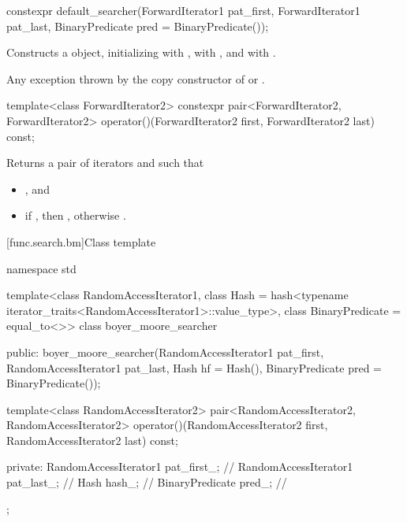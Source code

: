 %
\begin{itemdecl}
constexpr default_searcher(ForwardIterator1 pat_first, ForwardIterator1 pat_last,
                           BinaryPredicate pred = BinaryPredicate());
\end{itemdecl}

\begin{itemdescr}
\pnum
\effects
Constructs a  object, initializing 
with , \mbox{} with , and
 with .

\pnum
\throws
Any exception thrown by the copy constructor of  or
.
\end{itemdescr}

%
\begin{itemdecl}
template<class ForwardIterator2>
  constexpr pair<ForwardIterator2, ForwardIterator2>
    operator()(ForwardIterator2 first, ForwardIterator2 last) const;
\end{itemdecl}

\begin{itemdescr}
\pnum
\effects
Returns a pair of iterators  and  such that
\begin{itemize}
\item {}, and
\item if , then ,
otherwise .
\end{itemize}
\end{itemdescr}

[func.search.bm]{Class template }

%
\begin{codeblock}
namespace std {
  template<class RandomAccessIterator1,
           class Hash = hash<typename iterator_traits<RandomAccessIterator1>::value_type>,
           class BinaryPredicate = equal_to<>>
  class boyer_moore_searcher {
  public:
    boyer_moore_searcher(RandomAccessIterator1 pat_first,
                         RandomAccessIterator1 pat_last,
                         Hash hf = Hash(),
                         BinaryPredicate pred = BinaryPredicate());

    template<class RandomAccessIterator2>
      pair<RandomAccessIterator2, RandomAccessIterator2>
        operator()(RandomAccessIterator2 first, RandomAccessIterator2 last) const;

  private:
    RandomAccessIterator1 pat_first_;   // \expos
    RandomAccessIterator1 pat_last_;    // \expos
    Hash hash_;                         // \expos
    BinaryPredicate pred_;              // \expos
  };
}
\end{codeblock}

